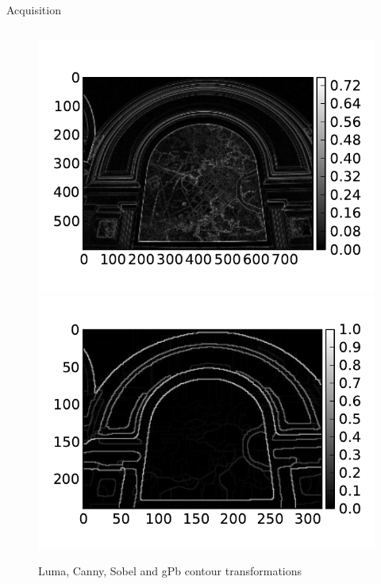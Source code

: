 \documentclass[mathserif]{beamer}
\begin{document}
\begin{frame}{Acquisition}
\begin{columns}[T]
\begin{column}{0.6\textwidth}
\begin{figure}
                    \includegraphics[width=.5\textwidth]{illustrations/input_example_sobel}
                    \includegraphics[width=.5\textwidth]{illustrations/input_example_segment}
                    \caption{Luma, Canny, Sobel and gPb contour transformations}
                \end{figure}
        \end{column}
    \end{columns}
\end{frame}
\end{document}
